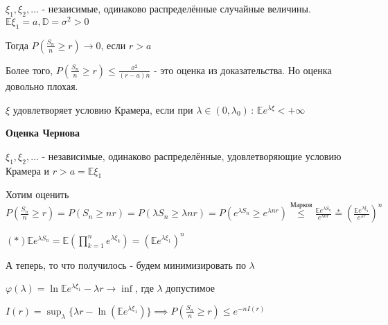  $\xi_1, \xi_2, \ldots$ - незаисимые, одинаково распределённые случайные величины. $\mathbb{E} \xi_1 = a, \mathbb{D} = \sigma^2 > 0$

 Тогда $P\left(\frac{S_n}{n} \geqslant r \right) \rightarrow 0$, если $r > a$

 Более того, $P \left( \frac{S_n}{n} \geqslant r \right) \leqslant \frac{\sigma^2}{(r - a)n}$ - это оценка из доказательства. Но оценка довольно плохая.

 \begin{definition}
    $\xi$ удовлетворяет условию Крамера, если при $\lambda \in (0, \lambda_0)\, : \, \mathbb{E} e^{\lambda \xi} < +\infty$
 \end{definition}

 \begin{theorem}
    
    \textbf{Оценка Чернова}

    $\xi_1, \xi_2, \ldots$ - независимые, одинаково распределённые, удовлетворяющие условию Крамера и $r > a = \mathbb{E}\xi_1$
    
    Хотим оценить $P\left( \frac{S_n}{n} \geqslant r \right) = P\left( S_n \geqslant nr \right) = P\left( \lambda S_n \geqslant \lambda nr \right) = P\left( e^{ \lambda S_n} \geqslant e^{\lambda nr} \right) \overset{\text{Марков}}{\leqslant} \frac{\mathbb{E} e^{\lambda S_n}}{e^{\lambda n r}}
    \overset{*}{=} \left( \frac{\mathbb{E} e^{\lambda \xi_1}}{e^{\lambda r}}  \right)^n$

    $(*) \mathbb{E} e^{\lambda S_n} = \mathbb{E} (\prod_{k = 1}^n e^{\lambda \xi_k}) = (\mathbb{E} e^{\lambda \xi_1})^n$

    А теперь, то что получилось - будем минимизировать по $\lambda$

    $\varphi (\lambda) = \ln \mathbb{E} e^{\lambda \xi_1} - \lambda r \rightarrow \inf$, где $\lambda$ допустимое

    $I(r) = \sup_{\lambda} \{ \lambda r - \ln (\mathbb{E} e^{\lambda \xi_1}) \} \implies P \left( \frac{S_n}{n} \geqslant r \right) \leqslant e^{-n I(r)}$
 \end{theorem}

